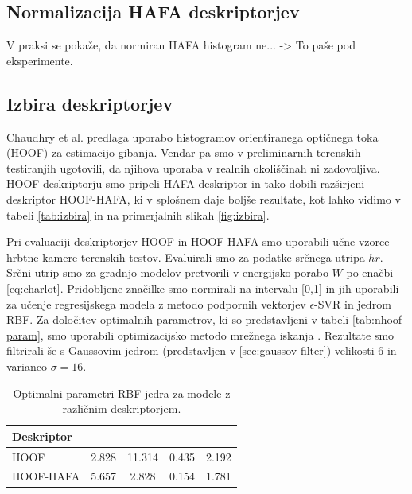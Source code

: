 \subsection{Normalizacija HAFA deskriptorjev}
V praksi se pokaže, da normiran HAFA histogram ne... -> To paše pod eksperimente.




\subsection{Izbira deskriptorjev}

Chaudhry et al. \cite{chaudhry2009histograms} predlaga uporabo histogramov orientiranega optičnega toka (HOOF) za estimacijo gibanja. Vendar pa smo v preliminarnih terenskih testiranjih \cite{koporec2017observation} ugotovili, da njihova uporaba v realnih okoliščinah ni zadovoljiva. HOOF deskriptorju smo pripeli HAFA deskriptor in tako dobili razširjeni deskriptor HOOF-HAFA, ki v splošnem daje boljše rezultate, kot lahko vidimo v tabeli \ref{tab:izbira} in na primerjalnih slikah \ref{fig:izbira}.

Pri evaluaciji deskriptorjev HOOF in HOOF-HAFA smo uporabili učne vzorce hrbtne kamere terenskih testov. Evaluirali smo za podatke srčnega utripa $hr$. Srčni utrip smo za gradnjo modelov pretvorili v energijsko porabo $W$ po enačbi \eqref{eq:charlot}. Pridobljene značilke smo normirali na intervalu [0,1] in jih uporabili za učenje regresijskega modela z metodo podpornih vektorjev $\epsilon$-SVR in jedrom RBF. Za določitev optimalnih parametrov, ki so predstavljeni v tabeli \ref{tab:nhoof-param}, smo uporabili optimizacijsko metodo mrežnega iskanja \cite{hsu2003practical}. Rezultate smo filtrirali še s Gaussovim jedrom (predstavljen v \ref{sec:gaussov-filter}) velikosti $6$ in varianco $\sigma=16$. 

\begin{table}[htb]
	\centering
    \begin{tabular}{l S[table-format=2.3] S[table-format=1.3] S[table-format=1.3] S[table-format=1.3]}
    \toprule
    \textbf{Deskriptor} &  & \thead{$\mathbf{\gamma}$} & \thead{$\mathbf{\epsilon}$} &  \\ 
    \midrule
    HOOF & 2.828 & 11.314 & 0.435 & 2.192 \\
    HOOF-HAFA & 5.657 & 2.828 & 0.154 & 1.781 \\
    \bottomrule
    \end{tabular}
    \caption[Optimalni parameteri RBF jedra modelov za izbiro deskriptorjev]{Optimalni parametri RBF jedra za modele z različnim deskriptorjem.}
    \label{tab:izbira-param}
\end{table}


